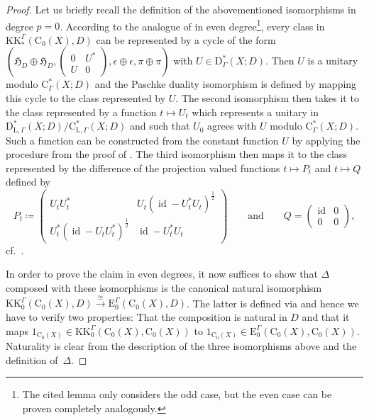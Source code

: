 \documentclass[11pt]{article}
\numberwithin{equation}{section}
\numberwithin{equation}{section}
\theoremstyle{definition}
\newcommand{\Ct}{\mathrm{C}}
\newcommand{\Cz}{\Ct_0}
\newcommand{\HilbertMod}{\mathfrak{H}}
\DeclareMathOperator{\id}{id}
\newcommand{\KK}{\mathrm{KK}}
\newcommand{\EE}{\mathrm{E}}
\newcommand{\Roe}{\mathrm{C}^*}
\newcommand{\PseudoLoc}{\mathrm{D}^*}
\newcommand{\Loc}{\mathrm{C}^*_{\mathrm{L},\Gamma}}
\newcommand{\PseudoLocLoc}{\mathrm{D}^*_{\mathrm{L},\Gamma}}
\begin{document}
\begin{proof}
Let us briefly recall the definition of the abovementioned isomorphisms in degree $p=0$.
According to the analogue of \cite[Lemma B.7]{GueWillYu_DyncomplKtheory} in even degree\footnote{The cited lemma only considers the odd case, but the even case can be proven completely analogously.}, every class in $\KK_*^\Gamma(\Cz(X),D)$ can be represented by a cycle of the form $\left(\HilbertMod_D\oplus\HilbertMod_D,\left(\begin{smallmatrix}0&U^*\\U&0\end{smallmatrix}\right)\!,\epsilon\oplus\epsilon,\pi\oplus\pi\right)$ with $U\in \PseudoLoc_\Gamma(X;D)$.
Then $U$ is a unitary modulo $\Roe_\Gamma(X;D)$ and the Paschke duality isomorphism is defined by mapping this cycle to the class represented by $U$. The second isomorphism then takes it to the class represented by a function $t\mapsto U_t$ which represents a unitary in $\PseudoLocLoc(X;D)/\Loc(X;D)$ and such that $U_0$ agrees with $U$ modulo $\Roe_\Gamma(X;D)$. Such a function can be constructed from the constant function $U$ by applying the procedure from the proof of \cite[Lemma~B.15]{GueWillYu_DyncomplKtheory}.
The third isomorphism then maps it to the class represented by the difference of the projection valued functions $t\mapsto P_t$ and $t\mapsto Q$ defined by
\[
P_t\coloneqq \begin{pmatrix}U_tU_t^*&U_t(\id-U_t^*U_t)^{\frac12} \\U_t^*(\id-U_tU_t^*)^{\frac12}&\id-U_t^*U_t\end{pmatrix}\qquad\text{and}\qquad Q=\begin{pmatrix}\id&0\\0&0\end{pmatrix}\!,
\]
cf.\ \cite[Proposition~4.8.10]{HigRoe}.

In order to prove the claim in even degrees, it now suffices to show that $\Delta$ composed with these isomorphisms is the canonical natural isomorphism $\KK_0^\Gamma(\Cz(X),D)\xrightarrow{\cong}\EE_0^\Gamma(\Cz(X),D)$.
The latter is defined via \cite[Theorem~2.2]{Thomsen_univKK} and hence we have to verify two properties: That the composition is natural in $D$ and that it maps $1_{\Cz(X)}\in\KK_0^\Gamma(\Cz(X),\Cz(X))$ to $1_{\Cz(X)}\in\EE_0^\Gamma(\Cz(X),\Cz(X))$. Naturality is clear from the description of the three isomorphisms above and the definition of~$\Delta$.


\end{proof}
\end{document}
